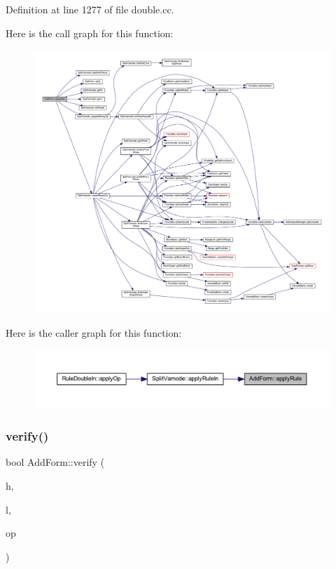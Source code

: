 Definition at line 1277 of file double.\+cc.

Here is the call graph for this function\+:
\nopagebreak
\begin{figure}[H]
\begin{center}
\leavevmode
\includegraphics[width=350pt]{class_add_form_a843a5b86cf92fddc19ce26b26ec13e48_cgraph}
\end{center}
\end{figure}
Here is the caller graph for this function\+:
\nopagebreak
\begin{figure}[H]
\begin{center}
\leavevmode
\includegraphics[width=350pt]{class_add_form_a843a5b86cf92fddc19ce26b26ec13e48_icgraph}
\end{center}
\end{figure}
\mbox{\label{class_add_form_a8209972b6d883948177d25dd9c4d9268}} 
\subsubsection{\texorpdfstring{verify()}{verify()}}
{\footnotesize\ttfamily bool Add\+Form\+::verify (\begin{DoxyParamCaption}\item[{\mbox{\hyperlink{class_varnode}{Varnode}} $\ast$}]{h,  }\item[{\mbox{\hyperlink{class_varnode}{Varnode}} $\ast$}]{l,  }\item[{\mbox{\hyperlink{class_pcode_op}{Pcode\+Op}} $\ast$}]{op }\end{DoxyParamCaption})}



